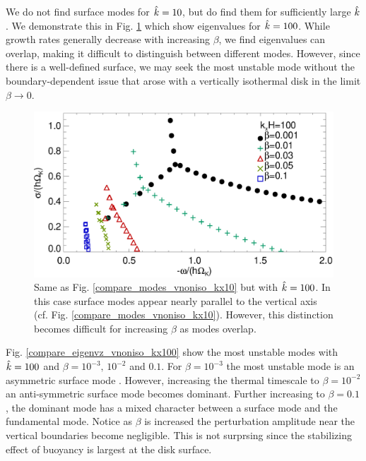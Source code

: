 We do not find surface modes for $\hat{k}=10$, but do find them for
sufficiently large $\hat{k}$. We demonstrate this in  %
Fig. \ref{compare_modes_vnoniso_kx100} which show eigenvalues for
$\hat{k}=100$. While growth rates generally decrease with increasing 
$\beta$, we find eigenvalues can overlap, making it difficult to 
distinguish between different modes. However, since there 
is a well-defined surface, we may seek the  
most unstable mode without the boundary-dependent issue that arose 
with a vertically isothermal disk in the limit $\beta\to0$.  

\begin{figure}
  \includegraphics[width=\linewidth,clip=true,trim=0cm 0cm 0cm
  0cm]{figures/compare_modes_Gam1.084_kx100.ps}
  \caption{Same as Fig. \ref{compare_modes_vnoniso_kx10} but with
    $\hat{k}=100$. In this case surface modes appear nearly parallel to
    the vertical axis
    (cf. Fig. \ref{compare_modes_vnoniso_kx10}). However, this
    distinction becomes difficult for increasing $\beta$ as modes
    overlap. 
    \label{compare_modes_vnoniso_kx100}}
\end{figure}

Fig. \ref{compare_eigenvz_vnoniso_kx100} show the most unstable modes
with $\hat{k}=100$ and $\beta=10^{-3},\, 10^{-2}$ and
$0.1$. For $\beta=10^{-3}$ the most 
unstable mode is an asymmetric surface mode . However, increasing the thermal timescale to
$\beta=10^{-2}$ an anti-symmetric surface mode becomes
dominant. Further increasing to $\beta=0.1$, the dominant mode has a
mixed character between a surface mode and the fundamental
mode. Notice as $\beta$ is increased the perturbation amplitude near
the vertical boundaries become negligible. This is not surprsing since  
the stabilizing effect of buoyancy is largest at the disk surface. 

